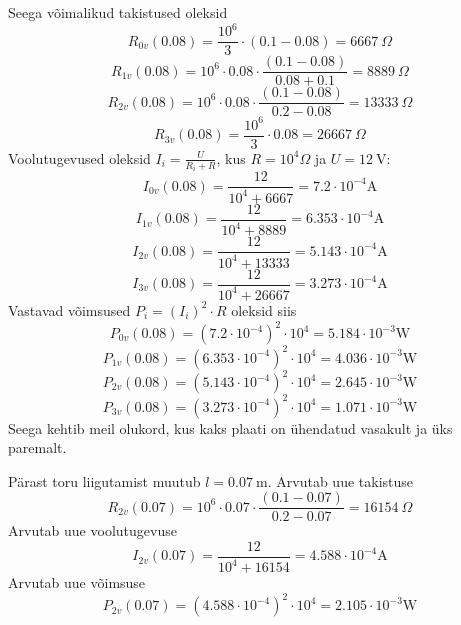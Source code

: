 \documentclass[10pt]{article}
\begin{document}
Seega võimalikud takistused oleksid
\[R_{0v}(0.08) = \frac{10^6}{3} \cdot (0.1-0.08) = \SI{6667}{\Omega}\]
\[R_{1v}(0.08) = 10^6 \cdot  0.08 \cdot \frac{(0.1-0.08)}{0.08+0.1} = \SI{8889}{\Omega}\]
\[R_{2v}(0.08) = 10^6 \cdot  0.08 \cdot  \frac{(0.1-0.08)}{0.2-0.08} = \SI{13333}{\Omega}\]
\[R_{3v}(0.08) = \frac{10^6}{3} \cdot 0.08 = \SI{26667}{\Omega}\]
Voolutugevused oleksid $I_i=\frac{U}{R_i  + R}$, kus $R = 10^4\si{\Omega}$ ja $U = \SI{12}{\volt}$:
\[ I_{0v}(0.08) = \frac{12}{10^4 + 6667} = 7.2 \cdot 10^{-4} \si{\ampere}\]
\[ I_{1v}(0.08) = \frac{12}{10^4 + 8889} = 6.353 \cdot 10^{-4} \si{\ampere}\]
\[ I_{2v}(0.08) = \frac{12}{10^4 + 13333} = 5.143 \cdot 10^{-4} \si{\ampere}\]
\[ I_{3v}(0.08) = \frac{12}{10^4 + 26667} = 3.273 \cdot 10^{-4} \si{\ampere}\]
Vastavad võimsused $P_i = (I_i)^2 \cdot R$ oleksid siis
\[ P_{0v}(0.08) = (7.2 \cdot 10^{-4})^2 \cdot 10^4 = 5.184 \cdot 10^{-3}  \si{\watt}\]
\[ P_{1v}(0.08) = (6.353 \cdot 10^{-4})^2 \cdot 10^4 = 4.036 \cdot 10^{-3}  \si{\watt}\]
\[ P_{2v}(0.08) = (5.143 \cdot 10^{-4})^2 \cdot 10^4 = 2.645 \cdot 10^{-3}  \si{\watt}\]
\[ P_{3v}(0.08) = (3.273 \cdot 10^{-4})^2 \cdot 10^4 = 1.071 \cdot 10^{-3}  \si{\watt}\]
Seega kehtib meil olukord, kus kaks plaati on ühendatud vasakult ja üks paremalt.

Pärast toru liigutamist muutub $l=\SI{0.07}{\meter} $.
Arvutab uue takistuse
\[ R_{2v}(0.07) =  10^6 \cdot 0.07 \cdot  \frac{(0.1-0.07)}{0.2-0.07} = \SI{16154}{\Omega} \]
Arvutab uue voolutugevuse
\[ I_{2v}(0.07) = \frac{12}{10^4 + 16154} = 4.588 \cdot 10^{-4} \si{\ampere}\]
Arvutab  uue võimsuse
\[ P_{2v}(0.07) = (4.588 \cdot 10^{-4})^2 \cdot 10^4 = 2.105 \cdot 10^{-3}  \si{\watt}\]
\probend
\bigskip

\end{document}
